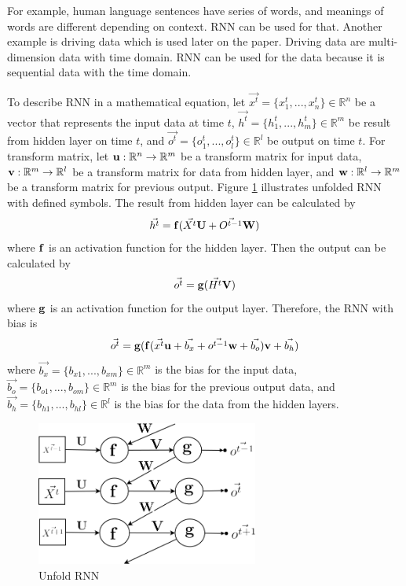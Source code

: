 \documentclass[draft,dvipsnames]{drexel-thesis}
\begin{document}
\begin{thesis}
	For example, human language sentences have series of words, and meanings of words are different depending on context. RNN can be used for that. Another example is driving data which is used later on the paper.  Driving data are multi-dimension data with time domain. RNN can be used for the data because it is sequential data with the time domain.

	To describe RNN in a mathematical equation, let $\vec{x^t} = \{ x_1^t, ..., x_n^t\} \in \mathbb{R}^n$ be a vector that represents the input data at time $t$, $\vec{h^t} = \{ h_1^t, ..., h_m^t\} \in \mathbb{R}^m$ be result from hidden layer on time $t$, and $\vec{o^t} = \{ o_1^t, ..., o_l^t\} \in \mathbb{R}^l$ be output on time $t$. For transform matrix, let $\bold{u}: \mathbb{R}^n \rightarrow \mathbb{R}^m$ be a transform matrix for input data, $\bold{v}: \mathbb{R}^m \rightarrow \mathbb{R}^l$ be a transform matrix for data from hidden layer, and $\bold{w}: \mathbb{R}^l \rightarrow \mathbb{R}^m$ be a transform matrix for previous output. Figure \ref{fig:unfold_RNN} illustrates unfolded RNN with defined symbols. The result from hidden layer can be calculated by
	$$\vec{h^t} = \bold{f}(\vec{X^t}\bold{U} + \vec{O^{t-1}}\bold{W})$$ where $\bold{f}$ is an activation function for the hidden layer. Then the output can be calculated by
	$$\vec{o^t} = \bold{g}(\vec{H^t}\bold{V})$$ where $\bold{g}$ is an activation function for the output layer. Therefore, the RNN with bias is
	$$\vec{o^t} = \bold{g}(\bold{f}(\vec{x^t}\bold{u}+\vec{b_x} + \vec{o^{t-1}}\bold{w}+\vec{b_o})\bold{v}+\vec{b_h})$$ where $\vec{b_x} = \{b_{x1}, ..., b_{xm}\} \in \mathbb{R}^m$ is the bias for the input data, $\vec{b_o} = \{b_{o1}, ..., b_{om}\} \in \mathbb{R}^m$ is the bias for the previous output data, and $\vec{b_h} = \{b_{h1}, ..., b_{hl}\} \in \mathbb{R}^l$ is the bias for the data from the hidden layers.

\begin{figure}[t!]
    \centering
    \includegraphics[width=0.65\textwidth]{pictures/figures/unfold_RNN.png}
    \caption{Unfold RNN}
    \label{fig:unfold_RNN}
\end{figure}


\end{thesis}
\end{document}
